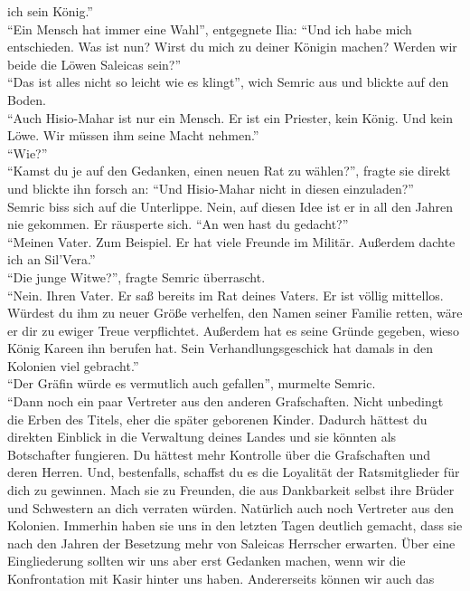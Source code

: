 ich sein König.''\\
``Ein Mensch hat immer eine Wahl'', entgegnete Ilia: ``Und ich habe mich entschieden. Was ist nun? 
Wirst du mich zu deiner Königin machen? Werden wir beide die Löwen Saleicas sein?''\\
``Das ist alles nicht so leicht wie es klingt'', wich Semric aus und blickte auf den Boden.\\
``Auch Hisio-Mahar ist nur ein Mensch. Er ist ein Priester, kein König. Und kein Löwe. Wir müssen 
ihm seine Macht nehmen.''\\
``Wie?''\\
``Kamst du je auf den Gedanken, einen neuen Rat zu wählen?'', fragte sie direkt und blickte ihn 
forsch an: ``Und Hisio-Mahar nicht in diesen einzuladen?''\\
Semric biss sich auf die Unterlippe. Nein, auf diesen Idee ist er in all den Jahren nie gekommen. 
Er räusperte sich. ``An wen hast du gedacht?''\\
``Meinen Vater. Zum Beispiel. Er hat viele Freunde im Militär. Außerdem dachte ich an Sil'Vera.''\\
``Die junge Witwe?'', fragte Semric überrascht.\\
``Nein. Ihren Vater. Er saß bereits im Rat deines Vaters. Er ist völlig mittellos. Würdest du ihm 
zu neuer Größe verhelfen, den Namen seiner Familie retten, wäre er dir zu ewiger Treue 
verpflichtet. Außerdem hat es seine Gründe gegeben, wieso König Kareen ihn berufen hat. Sein 
Verhandlungsgeschick hat damals in den Kolonien viel gebracht.''\\
``Der Gräfin würde es vermutlich auch gefallen'', murmelte Semric.\\
``Dann noch ein paar Vertreter aus den anderen Grafschaften. Nicht unbedingt die Erben des Titels, 
eher die später geborenen Kinder. Dadurch hättest du direkten Einblick in die Verwaltung deines 
Landes und sie könnten als Botschafter fungieren. Du hättest mehr Kontrolle über die Grafschaften 
und deren Herren. Und, bestenfalls, schaffst du es die Loyalität der Ratsmitglieder für dich zu 
gewinnen. Mach sie zu Freunden, die aus Dankbarkeit selbst ihre Brüder und Schwestern an dich 
verraten würden. Natürlich auch noch Vertreter aus den Kolonien. Immerhin haben sie uns in den 
letzten Tagen deutlich gemacht, dass sie nach den Jahren der Besetzung mehr von Saleicas 
Herrscher erwarten. Über eine Eingliederung sollten wir uns aber erst Gedanken machen, wenn wir 
die Konfrontation mit Kasir hinter uns haben. Andererseits können wir auch das 
